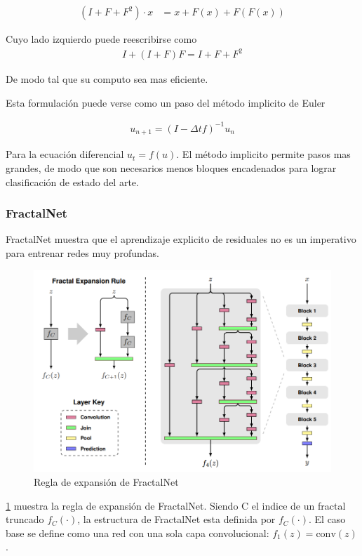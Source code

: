 \documentclass[titlepage,a4paper,oneside]{article}
\begin{document}
\begin{align}\label{PolyNet_ODE}
	(I + F + F^2) \cdot x &= x + F(x) + F(F(x))
\end{align}

Cuyo lado izquierdo puede reescribirse como
\begin{align}
	I + (I + F) F  = I + F + F^2
\end{align}

De modo tal que su computo sea mas eficiente.

Esta formulación puede verse como un paso del método implicito de Euler

\begin{align}
	u_{n+1} = (I -\Delta tf)^{-1}u_n
\end{align}

Para la ecuación diferencial $u_t = f(u)$. El método implicito permite pasos mas grandes, de modo que son necesarios menos bloques encadenados para lograr clasificación de estado del arte.

\subsubsection{FractalNet}
FractalNet \cite{larsson2017fractalnet} muestra que el aprendizaje explicito de residuales no es un imperativo para entrenar redes muy profundas.

\begin{figure}[H]
\centering
\includegraphics[width=\textwidth]{images/fractal_expansion.png}
\caption{Regla de expansión de FractalNet}
\label{fractal_expansion}
\end{figure}

\ref{fractal_expansion} muestra la regla de expansión de FractalNet. Siendo C el indice de un fractal truncado $f_C(\cdot)$, la estructura de FractalNet esta definida por $f_C(\cdot)$. El caso base se define como una red con una sola capa convolucional: $f_1(z) = \text{conv}(z)$.
\end{document}
